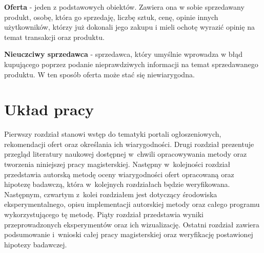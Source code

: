 \documentclass[../Kamil_Kowalewski_Main.tex]{subfiles}
\begin{document}
{{        \textbf{Oferta} - jeden z podstawowych obiektów. Zawiera ona w sobie
        sprzedawany produkt, osobę, która go sprzedaję, liczbę sztuk, cenę, opinie
        innych użytkowników, którzy już dokonali jego zakupu i mieli ochotę wyrazić
        opinię na temat transakcji oraz produktu.

        \textbf{Nieuczciwy sprzedawca} - sprzedawca, który umyślnie
        wprowadza w błąd kupującego poprzez podanie nieprawdziwych informacji na
        temat sprzedawanego produktu. W ten sposób oferta może stać się
        niewiarygodna.

    }

    \section{Układ pracy}
    \label{chapter1:wstep:uklad} {
        Pierwszy rozdział stanowi wstęp do tematyki portali ogłoszeniowych,
        rekomendacji ofert oraz określania ich wiarygodności. Drugi rozdział prezentuje
        przegląd literatury naukowej dostępnej w~chwili opracowywania metody oraz
        tworzenia niniejszej pracy magisterskiej. Następny w~kolejności rozdział
        przedstawia autorską metodę oceny wiarygodności ofert opracowaną oraz hipotezę
        badawczą, która w~kolejnych rozdziałach będzie weryfikowana. Następnym,
        czwartym z~kolei rozdziałem jest dotyczący środowiska eksperymentalnego, opisu
        implementacji autorskiej metody oraz całego programu wykorzystującego tę metodę.
        Piąty rozdział przedstawia wyniki przeprowadzonych eksperymentów oraz ich
        wizualizację. Ostatni rozdział zawiera podsumowanie i~wnioski całej pracy
        magisterskiej oraz weryfikację postawionej hipotezy badawczej.
    }

}
\end{document}
